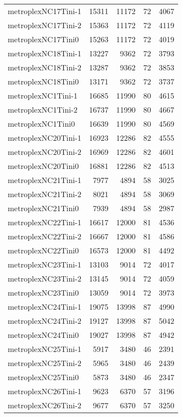 \begin{longtable}{lrrrr}
metroplexNC17Tini-1 & 15311 & 11172 & 72 & 4067 \\
metroplexNC17Tini-2 & 15363 & 11172 & 72 & 4119 \\
metroplexNC17Tini0 & 15263 & 11172 & 72 & 4019 \\
metroplexNC18Tini-1 & 13227 & 9362 & 72 & 3793 \\
metroplexNC18Tini-2 & 13287 & 9362 & 72 & 3853 \\
metroplexNC18Tini0 & 13171 & 9362 & 72 & 3737 \\
metroplexNC1Tini-1 & 16685 & 11990 & 80 & 4615 \\
metroplexNC1Tini-2 & 16737 & 11990 & 80 & 4667 \\
metroplexNC1Tini0 & 16639 & 11990 & 80 & 4569 \\
metroplexNC20Tini-1 & 16923 & 12286 & 82 & 4555 \\
metroplexNC20Tini-2 & 16969 & 12286 & 82 & 4601 \\
metroplexNC20Tini0 & 16881 & 12286 & 82 & 4513 \\
metroplexNC21Tini-1 & 7977 & 4894 & 58 & 3025 \\
metroplexNC21Tini-2 & 8021 & 4894 & 58 & 3069 \\
metroplexNC21Tini0 & 7939 & 4894 & 58 & 2987 \\
metroplexNC22Tini-1 & 16617 & 12000 & 81 & 4536 \\
metroplexNC22Tini-2 & 16667 & 12000 & 81 & 4586 \\
metroplexNC22Tini0 & 16573 & 12000 & 81 & 4492 \\
metroplexNC23Tini-1 & 13103 & 9014 & 72 & 4017 \\
metroplexNC23Tini-2 & 13145 & 9014 & 72 & 4059 \\
metroplexNC23Tini0 & 13059 & 9014 & 72 & 3973 \\
metroplexNC24Tini-1 & 19075 & 13998 & 87 & 4990 \\
metroplexNC24Tini-2 & 19127 & 13998 & 87 & 5042 \\
metroplexNC24Tini0 & 19027 & 13998 & 87 & 4942 \\
metroplexNC25Tini-1 & 5917 & 3480 & 46 & 2391 \\
metroplexNC25Tini-2 & 5965 & 3480 & 46 & 2439 \\
metroplexNC25Tini0 & 5873 & 3480 & 46 & 2347 \\
metroplexNC26Tini-1 & 9623 & 6370 & 57 & 3196 \\
metroplexNC26Tini-2 & 9677 & 6370 & 57 & 3250 \\

\end{longtable}
